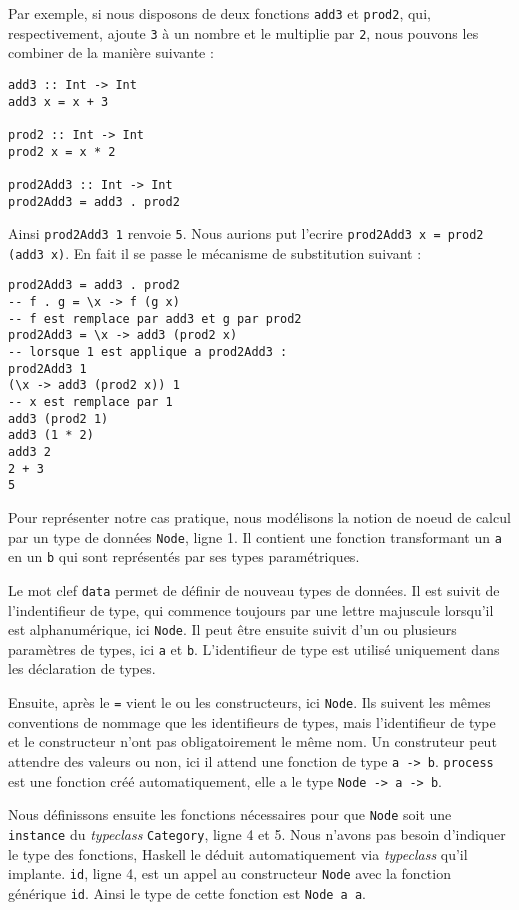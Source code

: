 \documentclass{llncs}
\begin{document}
Par exemple, si nous disposons de deux fonctions \lstinline{add3} et \lstinline{prod2},
qui, respectivement, ajoute \lstinline{3} à un nombre et le multiplie par \lstinline{2},
nous pouvons les combiner de la manière suivante :
\begin{lstlisting}
add3 :: Int -> Int
add3 x = x + 3

prod2 :: Int -> Int
prod2 x = x * 2

prod2Add3 :: Int -> Int
prod2Add3 = add3 . prod2
\end{lstlisting}

Ainsi \lstinline{prod2Add3 1} renvoie \lstinline{5}.
Nous aurions put l'ecrire \lstinline{prod2Add3 x = prod2 (add3 x)}.
En fait il se passe le mécanisme de substitution suivant :
\begin{lstlisting}
prod2Add3 = add3 . prod2
-- f . g = \x -> f (g x)
-- f est remplace par add3 et g par prod2
prod2Add3 = \x -> add3 (prod2 x)
-- lorsque 1 est applique a prod2Add3 :
prod2Add3 1
(\x -> add3 (prod2 x)) 1
-- x est remplace par 1
add3 (prod2 1)
add3 (1 * 2)
add3 2
2 + 3
5
\end{lstlisting}

Pour représenter notre cas pratique, nous modélisons la notion de noeud de calcul
par un type de données \lstinline{Node}, ligne 1.
Il contient une fonction transformant un \lstinline{a} en un \lstinline{b} qui
sont représentés par ses types paramétriques.

Le mot clef \lstinline{data} permet de définir de nouveau types de données.
Il est suivit de l'indentifieur de type, qui commence toujours par une lettre
majuscule lorsqu'il est alphanumérique, ici \lstinline{Node}.
Il peut être ensuite suivit d'un ou plusieurs paramètres de types, ici
\lstinline{a} et \lstinline{b}.
L'identifieur de type est utilisé uniquement dans les déclaration de types.

Ensuite, après le \lstinline{=} vient le ou les constructeurs, ici \lstinline{Node}.
Ils suivent les mêmes conventions de nommage que les identifieurs de types, mais
l'identifieur de type et le constructeur n'ont pas obligatoirement le même nom.
Un construteur peut attendre des valeurs ou non, ici il attend une fonction de
type \lstinline{a -> b}.
\lstinline{process} est une fonction créé automatiquement, elle a le type
\lstinline{Node -> a -> b}.

Nous définissons ensuite les fonctions nécessaires pour que \lstinline{Node} soit
une \lstinline{instance} du \emph{typeclass} \lstinline{Category}, ligne 4 et 5.
Nous n'avons pas besoin d'indiquer le type des fonctions, Haskell le déduit automatiquement
via \emph{typeclass} qu'il implante.
\lstinline{id}, ligne 4, est un appel au constructeur \lstinline{Node} avec la
fonction générique \lstinline{id}.
Ainsi le type de cette fonction est \lstinline{Node a a}.
\end{document}
